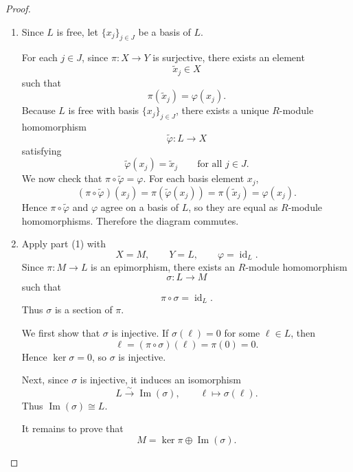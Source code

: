 \begin{proof}
    \begin{enumerate}
        \item Since $L$ is free, let $\{x_j\}_{j\in J}$ be a basis of $L$.

              For each $j\in J$, since $\pi:X\to Y$ is surjective, there exists an element
              \[
                  \tilde{x}_j \in X
              \]
              such that
              \[
                  \pi(\tilde{x}_j)=\varphi(x_j).
              \]
              Because $L$ is free with basis $\{x_j\}_{j\in J}$, there exists a unique $R$-module homomorphism
              \[
                  \tilde{\varphi}:L\to X
              \]
              satisfying
              \[
                  \tilde{\varphi}(x_j)=\tilde{x}_j
                  \qquad \text{for all } j\in J.
              \]
              We now check that $\pi\circ \tilde{\varphi}=\varphi$. For each basis element $x_j$,
              \[
                  (\pi\circ \tilde{\varphi})(x_j)
                  =\pi(\tilde{\varphi}(x_j))
                  =\pi(\tilde{x}_j)
                  =\varphi(x_j).
              \]
              Hence $\pi\circ \tilde{\varphi}$ and $\varphi$ agree on a basis of $L$, so they are equal as $R$-module homomorphisms. Therefore the diagram commutes.

        \item Apply part (1) with
              \[
                  X=M,\qquad Y=L,\qquad \varphi=\operatorname{id}_L.
              \]
              Since $\pi:M\to L$ is an epimorphism, there exists an $R$-module homomorphism
              \[
                  \sigma:L\to M
              \]
              such that
              \[
                  \pi\circ \sigma=\operatorname{id}_L.
              \]
              Thus $\sigma$ is a section of $\pi$.

              We first show that $\sigma$ is injective. If $\sigma(\ell)=0$ for some $\ell\in L$, then
              \[
                  \ell = (\pi\circ \sigma)(\ell)=\pi(0)=0.
              \]
              Hence $\ker \sigma=0$, so $\sigma$ is injective.

              Next, since $\sigma$ is injective, it induces an isomorphism
              \[
                  L \xrightarrow{\sim} \operatorname{Im}(\sigma),
                  \qquad \ell \mapsto \sigma(\ell).
              \]
              Thus $\operatorname{Im}(\sigma)\cong L$.

              It remains to prove that
              \[
                  M=\ker \pi \oplus \operatorname{Im}(\sigma).
              \]


\end{enumerate}
\end{proof}
